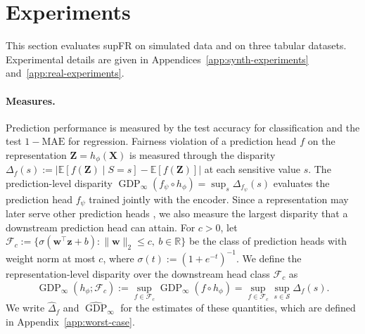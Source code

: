 \documentclass{article} %
\begin{document}
\section{Experiments}
\label{sec:experiments}

This section evaluates supFR on simulated data and on three tabular datasets.
Experimental details are given in Appendices~\ref{app:synth-experiments} and~\ref{app:real-experiments}.

\paragraph{Measures.}  Prediction performance is measured by the test accuracy for classification and the test $1-\mathrm{MAE}$ for regression.  Fairness violation of a prediction head $f$ on the representation $\mathbf{Z}=h_{\phi}(\mathbf{X})$ is measured through the disparity $\Delta_{f}(s):=|\mathbb{E}[f(\mathbf{Z})\mid S=s]-\mathbb{E}[f(\mathbf{Z})]|$ at each sensitive value $s$.
The prediction-level disparity $\operatorname{GDP}_{\infty}(f_{\psi}\circ h_{\phi}) = \sup_{s} \Delta_{f_{\psi}}(s)$ evaluates the prediction head $f_{\psi}$ trained jointly with the encoder.  Since a representation may later serve other prediction heads \citep{coston2021characterizing,gupta2021controllable,jovanovic2023fare,luo2026fair}, we also measure the largest disparity that a downstream prediction head can attain.  For $c>0$, let $\mathcal{F}_c:=\{\sigma(\mathbf{w}^\top\mathbf{z}+b):\lVert\mathbf{w}\rVert_2\le c,\ b\in\mathbb{R}\}$ be the class of prediction heads with weight norm at most $c$, where $\sigma(t):=(1+e^{-t})^{-1}.$ We define the representation-level disparity over the downstream head class $\mathcal{F}_c$ as
\begin{equation}
  \operatorname{GDP}_{\infty}(h_{\phi};\mathcal{F}_c):=\sup_{f\in\mathcal{F}_c}\operatorname{GDP}_{\infty}(f\circ h_{\phi}) = \sup_{f\in\mathcal{F}_c} \sup_{s \in \mathcal{S}} \Delta_{f}(s).
  \label{eq:worst-case-gdp}
\end{equation}
We write $\widehat{\Delta}_{f}$ and $\widehat{\operatorname{GDP}}_{\infty}$ for the estimates of these quantities, which are defined in Appendix~\ref{app:worst-case}.
\end{document}
